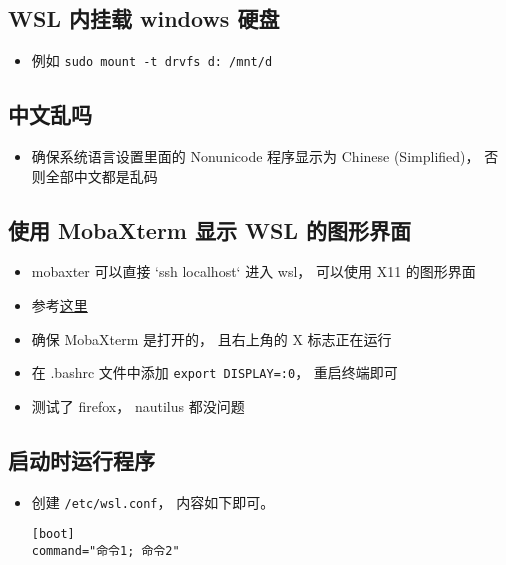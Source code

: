 \subsection{WSL 内挂载 windows 硬盘}
\begin{itemize}
\item 例如 \verb`sudo mount -t drvfs d: /mnt/d`
\end{itemize}

\subsection{中文乱吗}
\begin{itemize}
\item 确保系统语言设置里面的 Nonunicode 程序显示为 Chinese (Simplified)， 否则全部中文都是乱码
\end{itemize}

\subsection{使用 MobaXterm 显示 WSL 的图形界面}
\begin{itemize}
\item mobaxter 可以直接 `ssh localhost` 进入 wsl， 可以使用 X11 的图形界面
\item 参考\href{https://nickjanetakis.com/blog/using-wsl-and-mobaxterm-to-create-a-linux-dev-environment-on-windows}{这里}
\item 确保 MobaXterm 是打开的， 且右上角的 X 标志正在运行
\item 在 .bashrc 文件中添加 \verb`export DISPLAY=:0`， 重启终端即可
\item 测试了 firefox， nautilus 都没问题
\end{itemize}

\subsection{启动时运行程序}
\begin{itemize}
\item 创建 \verb|/etc/wsl.conf|， 内容如下即可。
\begin{lstlisting}[language=none]
[boot]
command="命令1; 命令2"
\end{lstlisting}
\end{itemize}
